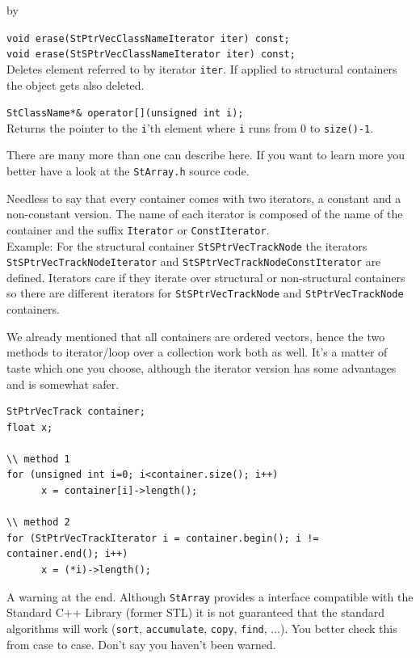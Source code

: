 \documentclass[twoside]{article}
\newcommand{\entrylabel}[1]{\mbox{\textbf{{#1}}}\hfil}%
\newenvironment{entry}
{\begin{list}{}%
    {\renewcommand{\makelabel}{\entrylabel}%
     \setlength{\labelwidth}{90pt}%
     \setlength{\leftmargin}{\labelwidth}
     \advance\leftmargin by \labelsep%
      }%
    }%
  {\end{list}}
\newcommand{\Entrylabel}[1]%
{\raisebox{0pt}[1ex][0pt]{\makebox[\labelwidth][l]%
    {\parbox[t]{\labelwidth}{\hspace{0pt}\textbf{{#1}}}}}}
\newenvironment{Entry}%
{\renewcommand{\entrylabel}{\Entrylabel}\begin{entry}}%
  {\end{entry}}
\begin{document}
\begin{Entry}
    \verb+void erase(StPtrVecClassNameIterator iter) const;+\\
    \verb+void erase(StSPtrVecClassNameIterator iter) const;+\\
    Deletes element referred to by iterator \texttt{iter}.  If applied
    to structural containers the object gets also deleted.
    
\item[Public Member\\ Operators]
    \verb+StClassName*& operator[](unsigned int i);+\\
    Returns the pointer to the \texttt{i}'th element where \texttt{i}
    runs from 0 to \texttt{size()-1}.
\end{Entry}
There are many more than one can describe here.  If you want to learn
more you better have a look at the \texttt{StArray.h} source code.

Needless to say that every container comes with two iterators, a
constant and a non-constant version.  The name of each iterator is
composed of the name of the container and the
suffix \texttt{Iterator} or \texttt{ConstIterator}.\\
Example: For the structural container \texttt{StSPtrVecTrackNode} the
iterators \texttt{StSPtrVecTrackNodeIterator} and
\texttt{StSPtrVecTrackNodeConstIterator} are defined. Iterators care
if they iterate over structural or non-structural containers so there
are different iterators for \texttt{StSPtrVecTrackNode} and
\texttt{StPtrVecTrackNode} containers.

We already mentioned that all containers are ordered vectors, hence
the two methods to iterator/loop over a collection work both as well.
It's a matter of taste which one you choose, although the iterator
version has some advantages and is somewhat safer.

\begin{verbatim}
StPtrVecTrack container;
float x;

\\ method 1
for (unsigned int i=0; i<container.size(); i++)
      x = container[i]->length();

\\ method 2
for (StPtrVecTrackIterator i = container.begin(); i != container.end(); i++)
      x = (*i)->length();
\end{verbatim}

A warning at the end. Although \texttt{StArray} provides a interface
compatible with the Standard C++ Library (former STL) it is not
guaranteed that the standard algorithms will work (\texttt{sort},
\texttt{accumulate}, \texttt{copy}, \texttt{find}, ...). You better
check this from case to case. Don't say you haven't been warned.
\end{document}
